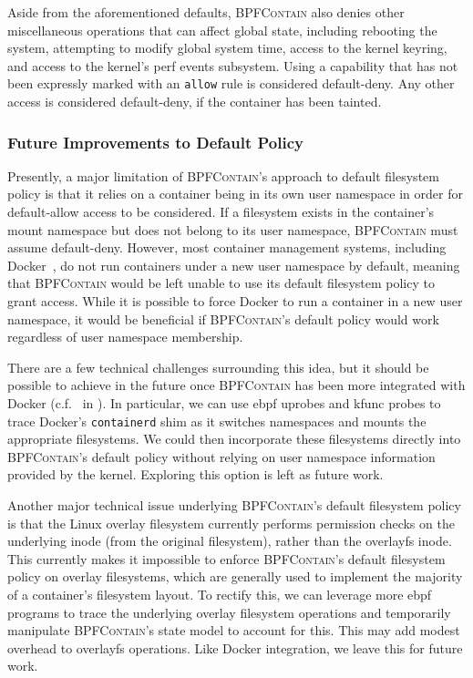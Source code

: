 \documentclass[
  fontsize=12pt,
  titlepage=firstiscover,
  paper=letter,
oneside,
  cleardoublepage=plain,
  parskip=half-,
  DIV=10,
  parindent,
  appendixprefix,
  chapterprefix,
  listof=totoc,
]{scrbook}
\newcommand{\bpfcontain}{\textsc{BPFContain}}
\begin{document}
Aside from the aforementioned defaults, \bpfcontain{} also denies other miscellaneous
operations that can affect global state, including rebooting the system, attempting to
modify global system time, access to the kernel keyring, and access to the kernel's perf
events subsystem. Using a capability that has not been expressly marked with
an \texttt{allow} rule is considered default-deny. Any other access is considered
default-deny, if the container has been tainted.

\subsubsection{Future Improvements to Default Policy}\label{sss:bpfcontain-improving-default}

Presently, a major limitation of \bpfcontain{}'s approach to default filesystem policy is
that it relies on a container being in its own user namespace in order for default-allow
access to be considered. If a filesystem exists in the container's mount namespace but
does not belong to its user namespace, \bpfcontain{} must assume default-deny. However,
most container management systems, including Docker~\cite{docker_security}, do not run
containers under a new user namespace by default, meaning that \bpfcontain{} would be left
unable to use its default filesystem policy to grant access. While it is possible to force
Docker to run a container in a new user namespace, it would be beneficial if
\bpfcontain{}'s default policy would work regardless of user namespace membership.

There are a few technical challenges surrounding this idea, but it should be possible to
achieve in the future once \bpfcontain{} has been more integrated with Docker
(c.f.\  in ). In particular, we can use
\gls{ebpf} uprobes and kfunc probes to trace Docker's \texttt{containerd} shim as it switches
namespaces and mounts the appropriate filesystems. We could then incorporate these
filesystems directly into \bpfcontain{}'s default policy without relying on user
namespace information provided by the kernel. Exploring this option is left as future work.

Another major technical issue underlying \bpfcontain{}'s default filesystem policy is that
the Linux overlay filesystem currently performs permission checks on the underlying inode
(from the original filesystem), rather than the overlayfs inode. This currently makes it
impossible to enforce \bpfcontain{}'s default filesystem policy on overlay filesystems,
which are generally used to implement the majority of a container's filesystem layout.  To
rectify this, we can leverage more \gls{ebpf} programs to trace the underlying overlay
filesystem operations and temporarily manipulate \bpfcontain{}'s state model to account
for this. This may add modest overhead to overlayfs operations. Like Docker integration,
we leave this for future work.
\end{document}
